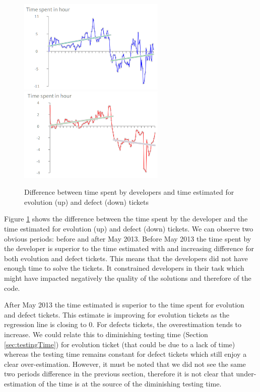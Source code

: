 \documentclass[10pt,conference]{IEEEtran}
\begin{document}

\begin{figure}[htbp]
  \centering
  \includegraphics[width=70mm]{./images/estimateEvol.png}\\
  \includegraphics[width=70mm]{./images/estimateBug.png}
    \caption{Difference between time spent by  developers and time estimated for  evolution (up) and defect (down) tickets}
  \label{fig:devEst}
\end{figure}

Figure \ref{fig:devEst} shows the  difference between the time spent by the developer and the time estimated for evolution (up) and defect (down) tickets.
We can observe two obvious periods: before and after May 2013. 
Before May 2013 the time spent by the developer is superior to the time estimated with and increasing difference for both evolution and defect tickets.
This means that the developers did not have enough time to solve the tickets.
It constrained developers in their task which might have impacted negatively the quality of the solutions and therefore of the code.
 
After May 2013 the time estimated is superior to the time spent for evolution and defect tickets. 
This estimate is improving for evolution tickets as the regression line is closing to 0.
For defects tickets, the overestimation tends to increase.
We could relate this to diminishing testing time (Section \ref{sec:testingTime}) for evolution ticket (that could be due to a lack of time) whereas the testing time remains constant for defect tickets which still enjoy a clear over-estimation.
However, it must be noted that we did not see the same two periods difference in the previous section, therefore it is not clear that under-estimation of the time is at the source of the diminishing testing time.
\end{document}
